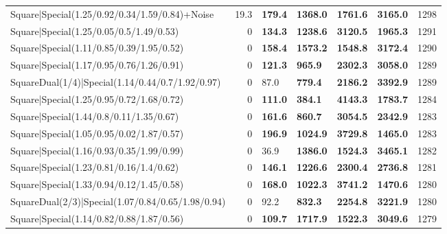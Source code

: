 \begin{tabular}{lrllllr}
 Square|Special(1.25/0.92/0.34/1.59/0.84)+Noise                &            19.3 & \textbf{179.4} & \textbf{1368.0} & \textbf{1761.6} & \textbf{3165.0} &         1298 \\
 Square|Special(1.25/0.05/0.5/1.49/0.53)                       &             0   & \textbf{134.3} & \textbf{1238.6} & \textbf{3120.5} & \textbf{1965.3} &         1291 \\
 Square|Special(1.11/0.85/0.39/1.95/0.52)                      &             0   & \textbf{158.4} & \textbf{1573.2} & \textbf{1548.8} & \textbf{3172.4} &         1290 \\
 Square|Special(1.17/0.95/0.76/1.26/0.91)                      &             0   & \textbf{121.3} & \textbf{965.9}  & \textbf{2302.3} & \textbf{3058.0} &         1289 \\
 SquareDual(1/4)|Special(1.14/0.44/0.7/1.92/0.97)              &             0   & 87.0           & \textbf{779.4}  & \textbf{2186.2} & \textbf{3392.9} &         1289 \\
 Square|Special(1.25/0.95/0.72/1.68/0.72)                      &             0   & \textbf{111.0} & \textbf{384.1}  & \textbf{4143.3} & \textbf{1783.7} &         1284 \\
 Square|Special(1.44/0.8/0.11/1.35/0.67)                       &             0   & \textbf{161.6} & \textbf{860.7}  & \textbf{3054.5} & \textbf{2342.9} &         1283 \\
 Square|Special(1.05/0.95/0.02/1.87/0.57)                      &             0   & \textbf{196.9} & \textbf{1024.9} & \textbf{3729.8} & \textbf{1465.0} &         1283 \\
 Square|Special(1.16/0.93/0.35/1.99/0.99)                      &             0   & 36.9           & \textbf{1386.0} & \textbf{1524.3} & \textbf{3465.1} &         1282 \\
 Square|Special(1.23/0.81/0.16/1.4/0.62)                       &             0   & \textbf{146.1} & \textbf{1226.6} & \textbf{2300.4} & \textbf{2736.8} &         1281 \\
 Square|Special(1.33/0.94/0.12/1.45/0.58)                      &             0   & \textbf{168.0} & \textbf{1022.3} & \textbf{3741.2} & \textbf{1470.6} &         1280 \\
 SquareDual(2/3)|Special(1.07/0.84/0.65/1.98/0.94)             &             0   & 92.2           & \textbf{832.3}  & \textbf{2254.8} & \textbf{3221.9} &         1280 \\
 Square|Special(1.14/0.82/0.88/1.87/0.56)                      &             0   & \textbf{109.7} & \textbf{1717.9} & \textbf{1522.3} & \textbf{3049.6} &         1279 \\

\end{tabular}
